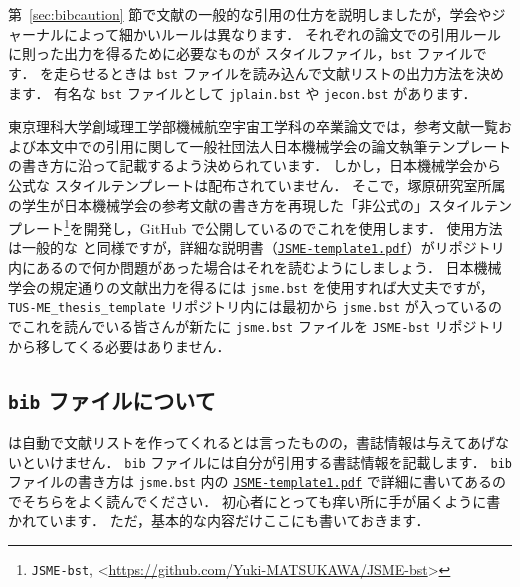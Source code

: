第~\ref{sec:bibcaution} 節で文献の一般的な引用の仕方を説明しましたが，学会やジャーナルによって細かいルールは異なります．
それぞれの論文での引用ルールに則った出力を得るために必要なものが \BibTeX スタイルファイル，\verb|bst| ファイルです．
\BibTeX を走らせるときは \verb|bst| ファイルを読み込んで文献リストの出力方法を決めます．
有名な \verb|bst| ファイルとして \verb|jplain.bst| や \verb|jecon.bst| があります．

東京理科大学創域理工学部機械航空宇宙工学科の卒業論文では，参考文献一覧および本文中での引用に関して一般社団法人日本機械学会の論文執筆テンプレートの書き方に沿って記載するよう決められています．
しかし，日本機械学会から公式な \BibTeX スタイルテンプレートは配布されていません．
そこで，塚原研究室所属の学生が日本機械学会の参考文献の書き方を再現した「非公式の」\BibTeX スタイルテンプレート\footnote{\texttt{JSME-bst}, \textless\url{https://github.com/Yuki-MATSUKAWA/JSME-bst}\textgreater}を開発し，GitHub で公開しているのでこれを使用します．
使用方法は一般的な \BibTeX と同様ですが，詳細な説明書（\href{https://github.com/Yuki-MATSUKAWA/JSME-bst/blob/main/JSME-template1.pdf}{\texttt{JSME-template1.pdf}}）がリポジトリ内にあるので何か問題があった場合はそれを読むようにしましょう．
日本機械学会の規定通りの文献出力を得るには \verb|jsme.bst| を使用すれば大丈夫ですが，\verb|TUS-ME_thesis_template| リポジトリ内には最初から \verb|jsme.bst| が入っているのでこれを読んでいる皆さんが新たに \verb|jsme.bst| ファイルを \verb|JSME-bst| リポジトリから移してくる必要はありません．

\subsection{\texttt{bib} ファイルについて}
\label{ssec:bib-file}

\BibTeX は自動で文献リストを作ってくれるとは言ったものの，書誌情報は与えてあげないといけません．
\verb|bib| ファイルには自分が引用する書誌情報を記載します．
\verb|bib| ファイルの書き方は \verb|jsme.bst| 内の \href{https://github.com/Yuki-MATSUKAWA/JSME-bst/blob/main/JSME-template1.pdf}{\texttt{JSME-template1.pdf}} で詳細に書いてあるのでそちらをよく読んでください．
\BibTeX 初心者にとっても痒い所に手が届くように書かれています．
ただ，基本的な内容だけここにも書いておきます．

